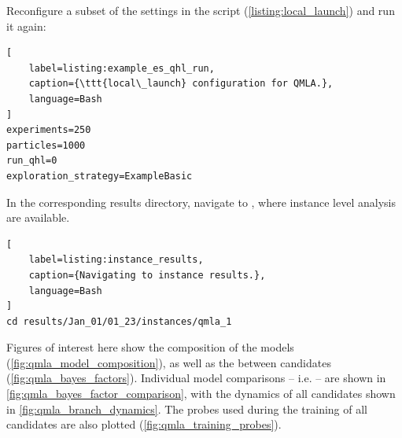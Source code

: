 Reconfigure a subset of the settings in the  script (\cref{listing:local_launch}) and run it again:
\begin{lstlisting}[
    label=listing:example_es_qhl_run,
    caption={\ttt{local\_launch} configuration for QMLA.},
    language=Bash
]
experiments=250
particles=1000
run_qhl=0
exploration_strategy=ExampleBasic
\end{lstlisting}

\par 

In the corresponding \gls{results directory}, navigate to , where instance level analysis are available. 

\begin{lstlisting}[
    label=listing:instance_results,
    caption={Navigating to instance results.},
    language=Bash
]
cd results/Jan_01/01_23/instances/qmla_1
\end{lstlisting}

Figures of interest here show the composition of the models (\cref{fig:qmla_model_composition}), 
    as well as the  between candidates (\cref{fig:qmla_bayes_factors}). 
Individual model comparisons -- i.e.  -- 
    are shown in \cref{fig:qmla_bayes_factor_comparison}, 
    with the dynamics of all candidates shown in \cref{fig:qmla_branch_dynamics}. 
The probes used during the training of all candidates are also plotted  (\cref{fig:qmla_training_probes}).

